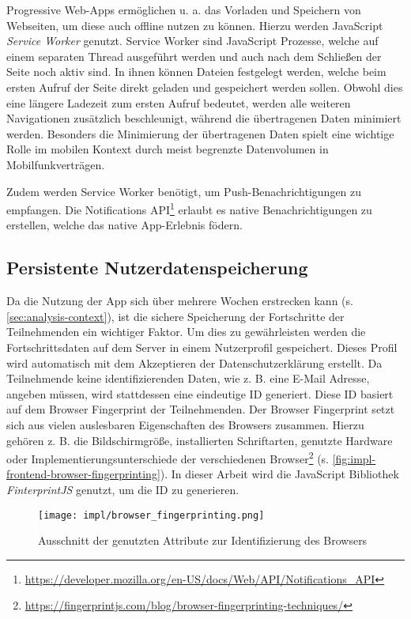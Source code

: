 Progressive Web-Apps ermöglichen u. a. das Vorladen und Speichern von Webseiten,
um diese auch offline nutzen zu können. Hierzu werden JavaScript \textit{Service
Worker} genutzt. Service Worker sind JavaScript Prozesse, welche auf einem
separaten Thread ausgeführt werden und auch nach dem Schließen der Seite noch
aktiv sind. In ihnen können Dateien festgelegt werden, welche beim ersten Aufruf
der Seite direkt geladen und gespeichert werden sollen. Obwohl dies eine längere
Ladezeit zum ersten Aufruf bedeutet, werden alle weiteren Navigationen
zusätzlich beschleunigt, während die übertragenen Daten minimiert werden.
Besonders die Minimierung der übertragenen Daten spielt eine wichtige Rolle im
mobilen Kontext durch meist begrenzte Datenvolumen in Mobilfunkverträgen.

Zudem werden Service Worker benötigt, um Push-Benachrichtigungen zu empfangen.
Die Notifications
API\footnote{\url{https://developer.mozilla.org/en-US/docs/Web/API/Notifications_API}}
erlaubt es native Benachrichtigungen zu erstellen, welche das native
App-Erlebnis födern.

\subsection{Persistente Nutzerdatenspeicherung}

Da die Nutzung der App sich über mehrere Wochen erstrecken kann (s.
\autoref{sec:analysis-context}), ist die sichere Speicherung der Fortschritte
der Teilnehmenden ein wichtiger Faktor. Um dies zu gewährleisten werden die
Fortschrittsdaten auf dem Server in einem Nutzerprofil gespeichert. Dieses
Profil wird automatisch mit dem Akzeptieren der Datenschutzerklärung erstellt.
Da Teilnehmende keine identifizierenden Daten, wie z. B. eine E-Mail Adresse,
angeben müssen, wird stattdessen eine eindeutige ID generiert. Diese ID basiert
auf dem Browser Fingerprint der Teilnehmenden. Der Browser Fingerprint setzt
sich aus vielen auslesbaren Eigenschaften des Browsers zusammen. Hierzu gehören
z. B. die Bildschirmgröße, installierten Schriftarten, genutzte Hardware oder
Implementierungsunterschiede der verschiedenen
Browser\footnote{\url{https://fingerprintjs.com/blog/browser-fingerprinting-techniques/}}
(s. \autoref{fig:impl-frontend-browser-fingerprinting}). In dieser Arbeit wird
die JavaScript Bibliothek \textit{FinterprintJS} \cite{FingerprintJS2022}
genutzt, um die ID zu generieren.

\begin{figure}[htpb]
    \centering
    \texttt{[image: impl/browser\_fingerprinting.png]}
    \caption{Ausschnitt der genutzten Attribute zur Identifizierung des Browsers
    \cite{FingerprintJS2022}}
    \label{fig:impl-frontend-browser-fingerprinting}
\end{figure}


